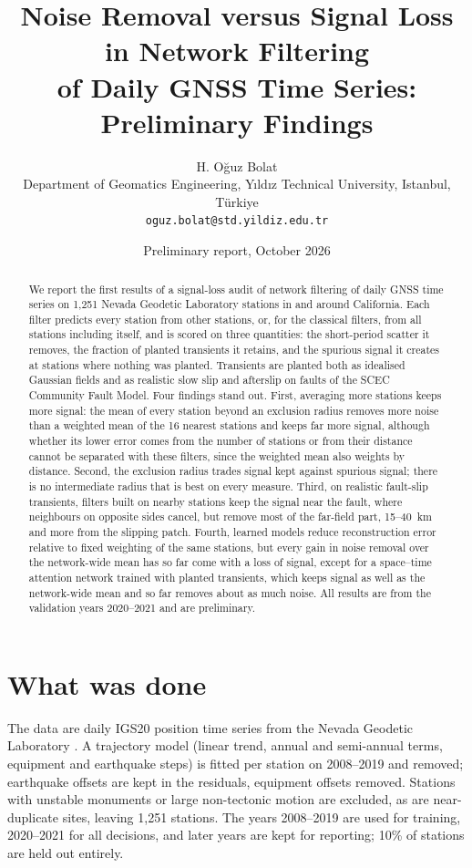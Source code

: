 \documentclass[11pt,a4paper]{article}
\title{Noise Removal versus Signal Loss in Network Filtering\\
of Daily GNSS Time Series: Preliminary Findings}
\author{H. O\u{g}uz Bolat\\[2pt]
\small Department of Geomatics Engineering, Y{\i}ld{\i}z Technical University, Istanbul, T\"urkiye\\
\small \texttt{oguz.bolat@std.yildiz.edu.tr}}
\date{Preliminary report, October 2026}
\begin{document}
\maketitle

\begin{abstract}
We report the first results of a signal-loss audit of network filtering of daily GNSS time series on 1,251 Nevada Geodetic Laboratory stations in and around California. Each filter predicts every station from other stations, or, for the classical filters, from all stations including itself, and is scored on three quantities: the short-period scatter it removes, the fraction of planted transients it retains, and the spurious signal it creates at stations where nothing was planted. Transients are planted both as idealised Gaussian fields and as realistic slow slip and afterslip on faults of the SCEC Community Fault Model. Four findings stand out. First, averaging more stations keeps more signal: the mean of every station beyond an exclusion radius removes more noise than a weighted mean of the 16 nearest stations and keeps far more signal, although whether its lower error comes from the number of stations or from their distance cannot be separated with these filters, since the weighted mean also weights by distance. Second, the exclusion radius trades signal kept against spurious signal; there is no intermediate radius that is best on every measure. Third, on realistic fault-slip transients, filters built on nearby stations keep the signal near the fault, where neighbours on opposite sides cancel, but remove most of the far-field part, 15--40~km and more from the slipping patch. Fourth, learned models reduce reconstruction error relative to fixed weighting of the same stations, but every gain in noise removal over the network-wide mean has so far come with a loss of signal, except for a space--time attention network trained with planted transients, which keeps signal as well as the network-wide mean and so far removes about as much noise. All results are from the validation years 2020--2021 and are preliminary.
\end{abstract}

\section{What was done}

The data are daily IGS20 position time series from the Nevada Geodetic Laboratory \citep{blewitt2018,ngl2026}. A trajectory model (linear trend, annual and semi-annual terms, equipment and earthquake steps) is fitted per station on 2008--2019 and removed; earthquake offsets are kept in the residuals, equipment offsets removed. Stations with unstable monuments or large non-tectonic motion are excluded, as are near-duplicate sites, leaving 1,251 stations. The years 2008--2019 are used for training, 2020--2021 for all decisions, and later years are kept for reporting; 10\% of stations are held out entirely.
\end{document}
